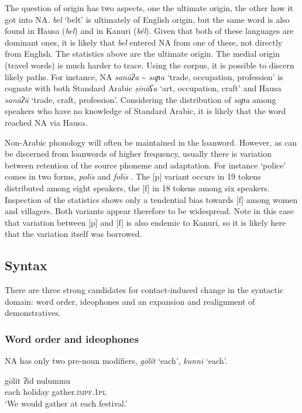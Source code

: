 \documentclass[output=paper]{langsci/langscibook}
\begin{document}
The question of origin has two aspects, one the ultimate origin, the other how it got into NA. \textit{bel} ‘belt’ is ultimately of English origin, but the same word is also found in Hausa (\textit{bel}) and in Kanuri (\textit{bêl}). Given that both of these languages are dominant ones, it is likely that \textit{bel} entered NA from one of these, not directly from English. The statistics above are the ultimate origin. The medial origin (travel words) is much harder to trace. Using the corpus, it is possible to discern likely paths. For instance, NA \textit{sanāʔa} {\textasciitilde} \textit{saɲa} ‘trade, occupation, profession’ is cognate with both Standard Arabic \textit{ṣināʕa} ‘art, occupation, craft’ and Hausa \textit{sanāʔā} `trade, craft, profession'. Considering the distribution of \textit{saɲa} among speakers who have no knowledge of Standard Arabic, it is likely that the word reached NA via Hausa.

Non-Arabic phonology will often be maintained in the loanword. However, as can be discerned from loanwords of higher frequency, usually there is variation between retention of the source phoneme and adaptation. For instance ‘police’ comes in two forms, \textit{polīs} and \textit{folīs} \citep[278]{Owens2000article}. The [p] variant occurs in 19 tokens distributed among eight speakers, the [f] in 18 tokens among six speakers. Inspection of the statistics shows only a tendential bias towards [f] among women and villagers. Both variants appear therefore to be widespread. Note in this case that variation between [p] and [f] is also endemic to Kanuri, so it is likely here that the variation itself was borrowed.

\subsection{Syntax} 

There are three strong candidates for contact-induced change in the syntactic domain: word order, ideophones and an expansion and realignment of demonstratives.

\subsubsection{Word order and ideophones}

NA has only two pre-noun modifiers, \textit{gōlit} ‘each’, \textit{kunni} ‘each’.

\ea \gll gōlit ʔīd nulummu\\
     each holiday gather\textsc{.impf.1pl}\\
\glt ‘We would gather at each festival.’
\z
\end{document}
